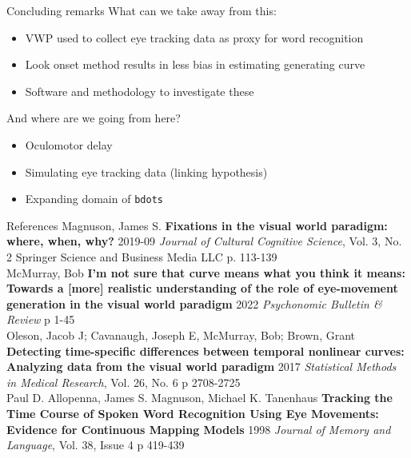 \documentclass{beamer}
\begin{document}
\begin{frame}{Concluding remarks}
What can we take away from this:
\begin{itemize}
\item VWP used to collect eye tracking data as proxy for word recognition
\item  Look onset method results in less bias in estimating generating curve
\item Software and methodology to investigate these
\end{itemize}
And where are we going from here?
\begin{itemize}
\item Oculomotor delay
\item Simulating eye tracking data (linking hypothesis)
\item Expanding domain of \texttt{bdots}
\end{itemize}
\end{frame}




\begin{frame}{References}\small
Magnuson, James S. \textbf{Fixations in the visual world paradigm: where, when, why?} 2019-09 \textit{Journal of Cultural Cognitive Science}, Vol. 3, No. 2 Springer  Science and Business Media LLC p. 113-139 \newline \\

McMurray, Bob \textbf{I'm not sure that curve means what you think it means: Towards a [more] realistic understanding of the role of eye-movement generation in the visual world paradigm} 2022 \textit{Psychonomic Bulletin \& Review} p 1-45 \newline \\

Oleson, Jacob J; Cavanaugh, Joseph E, McMurray, Bob; Brown, Grant \textbf{Detecting time-specific differences between temporal nonlinear curves: Analyzing data from the visual world paradigm} 2017 \textit{Statistical Methods in Medical Research}, Vol. 26, No. 6 p 2708-2725 \newline \\

Paul D. Allopenna, James S. Magnuson, Michael K. Tanenhaus
\textbf{Tracking the Time Course of Spoken Word Recognition Using Eye Movements: Evidence for Continuous Mapping Models} 1998 \textit{Journal of Memory and Language}, Vol. 38, Issue 4 p 419-439


\end{frame}
\end{document}
